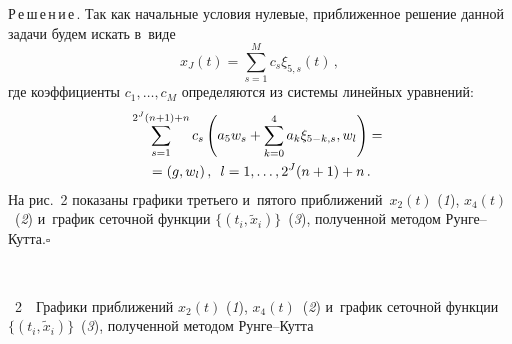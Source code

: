 \begin{multicols}{2}
\noindent
Р\,е\,ш\,е\,н\,и\,е\,.
Так как начальные условия нулевые, приближенное решение данной задачи будем  
искать в~виде
$$
x_J(t)=\sum\limits_{s=1}^M c_s {\xi}_{5,s}(t)\,,
$$
где коэффициенты $c_1,\dots, c_M$ определяются из системы линейных уравнений:
\begin{multline*}
\sum\limits_{s=1}^{2^J(n+1)+n} c_s \left(
a_5w_{s}+\sum\limits_{k=0}^4 a_k\xi_{5-k,s},w_l\right)={}\\
{}=
(g,w_l)\,,\enskip 
l=1,\dots,2^J(n+1)+n\,.
\end{multline*}
На рис.~2 показаны графики третьего и~пятого приближений~$x_2(t)$ 
(\textit{1}), $x_4(t)$~(\textit{2}) и~график 
сеточной функции $\{(t_i,\tilde{x}_i)\}$~(\textit{3}), 
полученной методом Рун\-ге--Кутта.\hfill $\square$

 { \begin{center}  %
 \vspace*{9pt}
 \mbox{%
 \epsfxsize=79.639mm 
 }


\end{center}


\noindent
{{\figurename~2}\ \ \small{Графики приближений $x_2(t)$ 
(\textit{1}), $x_4(t)$~(\textit{2}) 
и~график сеточной функции $\{(t_i,\tilde{x}_i)\}$~(\textit{3}), 
полученной методом Рун\-ге--Кутта}}
}

\vspace*{6pt}

\addtocounter{figure}{1}


\begin{figure*} %
\vspace*{1pt}
 \begin{center}
 \mbox{%
 \epsfxsize=164.758mm 
 }
  \end{center}
\vspace*{-9pt}
\begin{minipage}[t]{79mm}
\end{minipage}
\hfill
\vspace*{-9pt}
\begin{minipage}[t]{79mm}
\label{sy}
\end{minipage}
\vspace*{12pt}
\end{figure*}



\end{multicols}
